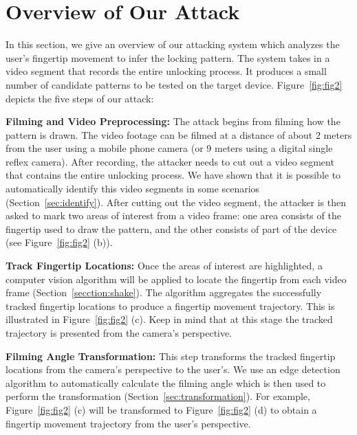 \section{Overview of Our Attack}
\label{section:overview}
    In this section, we give an overview of our attacking system which analyzes the user's fingertip movement to infer the locking pattern. The system takes in a video segment that records the entire unlocking process. It produces a small number of candidate patterns to be tested on the target device.
    Figure~\ref{fig:fig2} depicts the five steps of our attack:

    \vspace{2mm}
    \noindent {} \textbf{Filming and Video Preprocessing:} The attack begins from
        filming how the pattern is drawn. The video footage can be filmed at a distance of
        about 2 meters from the user using a mobile phone camera (or 9 meters using a digital single reflex camera). After recording, the attacker
        needs to cut out a video segment that contains the entire unlocking
        process. We have shown that it is possible to automatically identify this video segments in some scenarios (Section~\ref{sec:identify}).
        After cutting out the video segment, the attacker is then asked to mark two areas of interest from a video frame: one area consists of
        the fingertip used to draw the pattern, and the other consists of part of the device (see
    Figure~\ref{fig:fig2} (b)).

     \vspace{2mm}
    \noindent {}  \textbf{Track Fingertip Locations:} Once the areas of interest are highlighted, a computer vision algorithm will be applied
        to locate the fingertip from each video frame (Section~\ref{secction:shake}). The algorithm aggregates the successfully tracked fingertip locations to produce a fingertip movement trajectory.
        This is illustrated in Figure~\ref{fig:fig2} (c). Keep in mind that at this stage the tracked trajectory is presented from the camera's perspective.

     \vspace{2mm}
    \noindent {} \textbf{Filming Angle Transformation:}  This step transforms the tracked fingertip locations from the camera's perspective to the user's.
    We use an edge detection algorithm to automatically calculate the filming angle which is then used to perform the transformation (Section~\ref{sec:transformation}).
    For example, Figure~\ref{fig:fig2} (c) will be transformed to Figure~\ref{fig:fig2} (d) to obtain a fingertip movement trajectory from the user's perspective.

